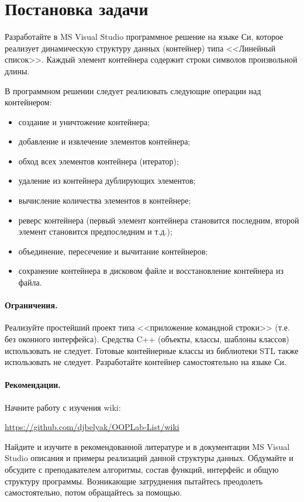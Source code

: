\section{Постановка задачи}

Разработайте в MS Visual Studio программное решение на языке Си, которое реализует динамическую структуру данных (контейнер) типа <<Линейный список>>. 
Каждый элемент контейнера содержит строки символов произвольной длины. 

В программном решении следует реализовать следующие операции над контейнером: 
\begin{itemize}
\item создание и уничтожение контейнера; 
\item  добавление и извлечение элементов контейнера; 
\item  обход всех элементов контейнера (итератор); 
\item удаление из контейнера дублирующих элементов; 
\item  вычисление количества элементов в контейнере; 
\item  реверс контейнера (первый элемент контейнера становится последним, второй элемент становится предпоследним и т.д.); 
\item  объединение, пересечение и вычитание контейнеров; 
\item  сохранение контейнера в дисковом файле и восстановление контейнера из файла. 
\end{itemize}

\paragraph{Ограничения.}

Реализуйте простейший проект типа <<приложение командной строки>> (т.е. без оконного интерфейса). 
Средства C++ (объекты, классы, шаблоны классов) использовать не следует. 
Готовые контейнерные классы из библиотеки STL также использовать не следует. Разработайте контейнер самостоятельно на языке Си. 

\paragraph{Рекомендации.}
 Начните работу с изучения wiki:

 \href{https://github.com/djbelyak/OOPLab-List/wiki}{https://github.com/djbelyak/OOPLab-List/wiki}

Найдите и изучите в рекомендованной литературе и в документации MS Visual Studio описания и примеры реализаций данной структуры данных. 
Обдумайте и обсудите с преподавателем алгоритмы, состав функций, интерфейс и общую структуру программы. 
Возникающие затруднения пытайтесь преодолеть самостоятельно, потом обращайтесь за помощью. 

